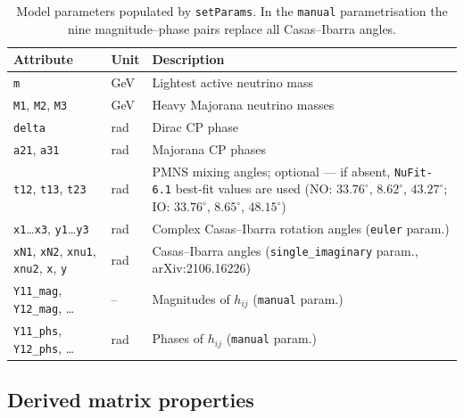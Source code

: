 \documentclass[12pt, a4paper]{article}
\begin{document}
\begin{table}[h!]
\centering\small
\renewcommand{\arraystretch}{1.25}
\begin{tabular}{p{5.0cm} p{1.4cm} p{7.4cm}}
\hline
\textbf{Attribute} & \textbf{Unit} & \textbf{Description} \\
\hline
\texttt{m}  & GeV & Lightest active neutrino mass \\
\texttt{M1}, \texttt{M2}, \texttt{M3} & GeV & Heavy Majorana neutrino masses \\
\texttt{delta}  & rad & Dirac CP phase \\
\texttt{a21}, \texttt{a31} & rad & Majorana CP phases \\
\texttt{t12}, \texttt{t13}, \texttt{t23} & rad
  & PMNS mixing angles; optional --- if absent, \texttt{NuFit-6.1} best-fit values are used
    (NO: $33.76^\circ$, $8.62^\circ$, $43.27^\circ$;
     IO: $33.76^\circ$, $8.65^\circ$, $48.15^\circ$) \\
\texttt{x1}\ldots\texttt{x3}, \texttt{y1}\ldots\texttt{y3} & rad
  & Complex Casas--Ibarra rotation angles (\texttt{euler} param.) \\
\texttt{xN1}, \texttt{xN2}, \texttt{xnu1}, \texttt{xnu2},
  \texttt{x}, \texttt{y} & rad
  & Casas--Ibarra angles (\texttt{single\_imaginary} param., arXiv:2106.16226) \\
\texttt{Y11\_mag}, \texttt{Y12\_mag}, \ldots & --
  & Magnitudes of $h_{ij}$ (\texttt{manual} param.) \\
\texttt{Y11\_phs}, \texttt{Y12\_phs}, \ldots & rad
  & Phases of $h_{ij}$ (\texttt{manual} param.) \\
\hline
\end{tabular}
\caption{Model parameters populated by \texttt{setParams}. In the \texttt{manual}
parametrisation the nine magnitude--phase pairs replace all Casas--Ibarra angles.}
\label{tab:ulsbase_params}
\end{table}

\subsection*{Derived matrix properties}
\end{document}
